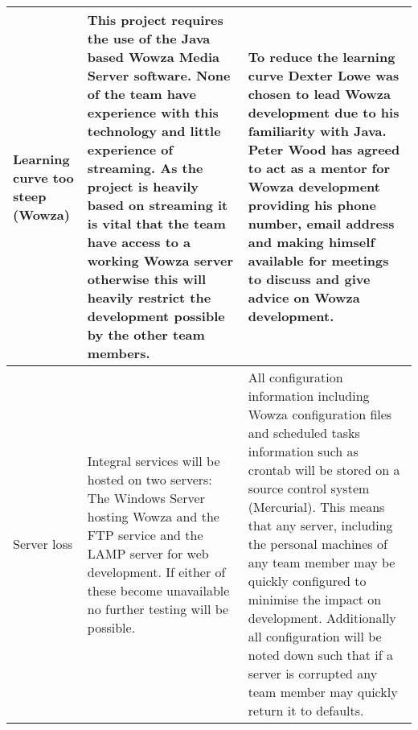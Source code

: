 \begin{center}
\begin{landscape}
\begin{longtable}{|p{3cm}|p{7cm}|p{12cm}|}
        Learning curve too steep (Wowza)                 & This project requires the use of the Java based Wowza Media Server software. None of the team have experience with this technology and little experience of streaming. As the project is heavily based on streaming it is vital that the team have access to a working Wowza server otherwise this will heavily restrict the development possible by the other team members. & To reduce the learning curve Dexter Lowe was chosen to lead Wowza development due to his familiarity with Java. Peter Wood has agreed to act as a mentor for Wowza development providing his phone number, email address and making himself available for meetings to discuss and give advice on Wowza development.                                                                                                                                                                                                                                                                                                                                                                                                                                                                                                                                                                                                                                                                                                                      \\ \hline
        Server loss                                      & Integral services will be hosted on two servers: The Windows Server hosting Wowza and the FTP service and the LAMP server for web development. If either of these become unavailable no further testing will be possible.                                                                                                                                                    & All configuration information including Wowza configuration files and scheduled tasks information such as crontab will be stored on a source control system (Mercurial). This means that any server, including the personal machines of any team member may be quickly configured to minimise the impact on development. Additionally all configuration will be noted down such that if a server is corrupted any team member may quickly return it to defaults.                                                                                                                                                                                                                                                                                                                                                                                                                                                                                                                                                                         \\ \hline

\end{longtable}
\end{landscape}
\end{center}
